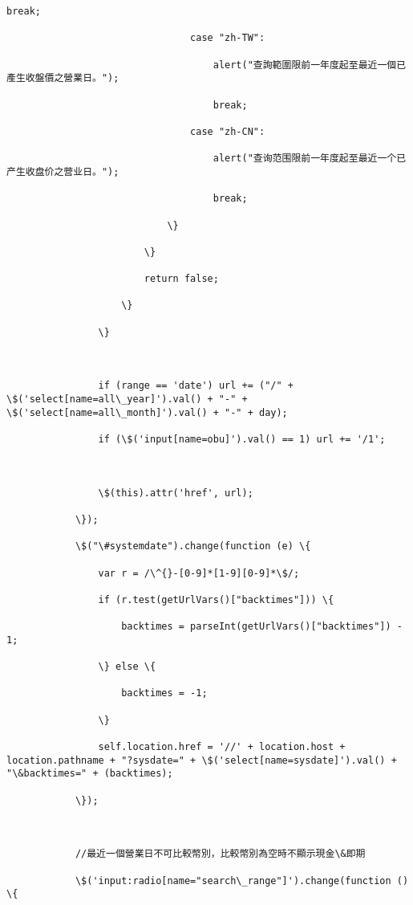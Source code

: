 \documentclass[11pt]{article}
\begin{document}
\begin{Verbatim}[commandchars=\\\{\}]
                                    break;

                                case "zh-TW":

                                    alert("查詢範圍限前一年度起至最近一個已產生收盤價之營業日。");

                                    break;

                                case "zh-CN":

                                    alert("查询范围限前一年度起至最近一个已产生收盘价之营业日。");

                                    break;

                            \}

                        \}

                        return false;

                    \}

                \}



                if (range == 'date') url += ("/" + \$('select[name=all\_year]').val() + "-" + \$('select[name=all\_month]').val() + "-" + day);

                if (\$('input[name=obu]').val() == 1) url += '/1';



                \$(this).attr('href', url);

            \});

            \$("\#systemdate").change(function (e) \{

                var r = /\^{}-[0-9]*[1-9][0-9]*\$/;

                if (r.test(getUrlVars()["backtimes"])) \{

                    backtimes = parseInt(getUrlVars()["backtimes"]) - 1;

                \} else \{

                    backtimes = -1;

                \}

                self.location.href = '//' + location.host + location.pathname + "?sysdate=" + \$('select[name=sysdate]').val() + "\&backtimes=" + (backtimes);

            \});



            //最近一個營業日不可比較幣別，比較幣別為空時不顯示現金\&即期

            \$('input:radio[name="search\_range"]').change(function () \{


\end{Verbatim}
\end{document}
